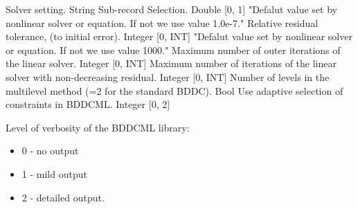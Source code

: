 \begin{RecordType}
	{}
	{} %
	{} %
	{} %
	{{{Solver setting.}}}
		\KeyItem
			{}
			{{String}}
			{\textrangle}
			{} %
			{{{Sub-record Selection.}}}
		\KeyItem
			{}
			{{Double [0, 1]}}
			{"{Defalut value set by nonlinear solver or equation. If not we use value 1.0e-7.}"}
			{} %
			{{{Relative residual tolerance,  (to initial error).}}}
		\KeyItem
			{}
			{{Integer [0, INT]}}
			{"{Defalut value set by nonlinear solver or equation. If not we use value 1000.}"}
			{} %
			{{{Maximum number of outer iterations of the linear solver.}}}
		\KeyItem
			{}
			{{Integer [0, INT]}}
			{\textrangle}
			{} %
			{{{Maximum number of iterations of the linear solver with non-decreasing residual.}}}
		\KeyItem
			{}
			{{Integer [0, INT]}}
			{\textrangle}
			{} %
			{{{Number of levels in the multilevel method (=2 for the standard BDDC).}}}
		\KeyItem
			{}
			{{Bool}}
			{\textrangle}
			{} %
			{{{Use adaptive selection of constraints in BDDCML.}}}
		\KeyItem
			{}
			{{Integer [0, 2]}}
			{\textrangle}
			{} %
			{{{{Level of verbosity of the BDDCML library:}
}
\begin{itemize}
\item {0 - no output}
\item {1 - mild output}
\item {2 - detailed output.}
\end{itemize}
}}
\end{RecordType}
